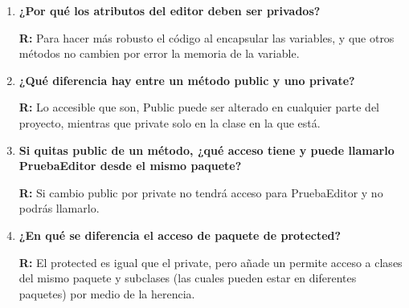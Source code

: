 \documentclass{article}
\begin{document}
\begin{cajarespuestas}
\begin{enumerate}
    \item \textbf{\bfseries ¿Por qué los atributos del editor deben ser privados?}
    
    \textbf{R:} Para hacer más robusto el código al encapsular las variables, y que otros métodos no cambien por error la memoria de la variable.

    \item \textbf{\bfseries ¿Qué diferencia hay entre un método public y uno private?}
    
    \textbf{R:} Lo accesible que son, Public puede ser alterado en cualquier parte del proyecto, mientras que private solo en la clase en la que está.

    \item \textbf{\bfseries Si quitas public de un método, ¿qué acceso tiene y puede llamarlo PruebaEditor desde el mismo paquete?}
    
    \textbf{R:} Si cambio public por private no tendrá acceso para PruebaEditor y no podrás llamarlo.

    \item \textbf{\bfseries ¿En qué se diferencia el acceso de paquete de protected?}
    
    \textbf{R:} El protected es igual que el private, pero añade un permite acceso a clases del mismo paquete y subclases (las cuales pueden estar en diferentes paquetes) por medio de la herencia.
\end{enumerate}
\end{cajarespuestas}
\end{document}
